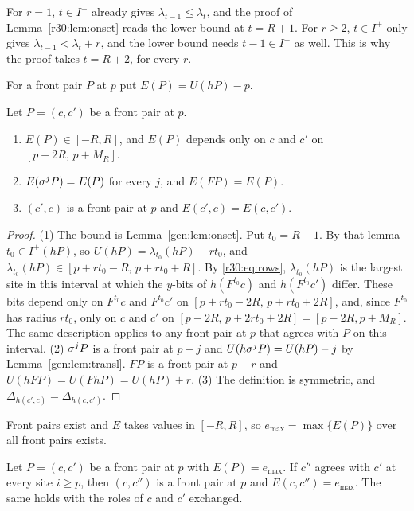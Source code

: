 For $r=1$, $t\in I^+$ already gives $\lambda_{t-1}\le\lambda_t$, and the proof of Lemma~\ref{r30:lem:onset} reads the lower bound at $t=R+1$. For $r\ge2$, $t\in I^+$ only gives $\lambda_{t-1}<\lambda_t+r$, and the lower bound needs $t-1\in I^+$ as well. This is why the proof takes $t=R+2$, for every $r$.

For a front pair $P$ at $p$ put $E(P)=U(hP)-p$.

\begin{lemma}\label{gen:lem:E}
Let $P=(c,c')$ be a front pair at $p$.
\begin{enumerate}
\item $E(P)\in[-R,R]$, and $E(P)$ depends only on $c$ and $c'$ on $[p-2R,\,p+M_R]$.
\item $E(\sigma^jP)=E(P)$ for every $j$, and $E(FP)=E(P)$.
\item $(c',c)$ is a front pair at $p$ and $E(c',c)=E(c,c')$.
\end{enumerate}
\end{lemma}

\begin{proof}
(1) The bound is Lemma~\ref{gen:lem:onset}. Put $t_0=R+1$. By that lemma $t_0\in I^+(hP)$, so $U(hP)=\lambda_{t_0}(hP)-rt_0$, and $\lambda_{t_0}(hP)\in[p+rt_0-R,\,p+rt_0+R]$. By \eqref{r30:eq:rows}, $\lambda_{t_0}(hP)$ is the largest site in this interval at which the $y$-bits of $h(F^{t_0}c)$ and $h(F^{t_0}c')$ differ. These bits depend only on $F^{t_0}c$ and $F^{t_0}c'$ on $[p+rt_0-2R,\,p+rt_0+2R]$, and, since $F^{t_0}$ has radius $rt_0$, only on $c$ and $c'$ on $[p-2R,\,p+2rt_0+2R]=[p-2R,p+M_R]$. The same description applies to any front pair at $p$ that agrees with $P$ on this interval.
(2) $\sigma^jP$ is a front pair at $p-j$ and $U(h\sigma^jP)=U(hP)-j$ by Lemma~\ref{gen:lem:transl}. $FP$ is a front pair at $p+r$ and $U(hFP)=U(FhP)=U(hP)+r$.
(3) The definition is symmetric, and $\Delta_{h(c',c)}=\Delta_{h(c,c')}$.
\end{proof}

Front pairs exist and $E$ takes values in $[-R,R]$, so $e_{\max}=\max\{E(P)\}$ over all front pairs exists.

\begin{lemma}\label{gen:lem:max}
Let $P=(c,c')$ be a front pair at $p$ with $E(P)=e_{\max}$. If $c''$ agrees with $c'$ at every site $i\ge p$, then $(c,c'')$ is a front pair at $p$ and $E(c,c'')=e_{\max}$. The same holds with the roles of $c$ and $c'$ exchanged.
\end{lemma}


